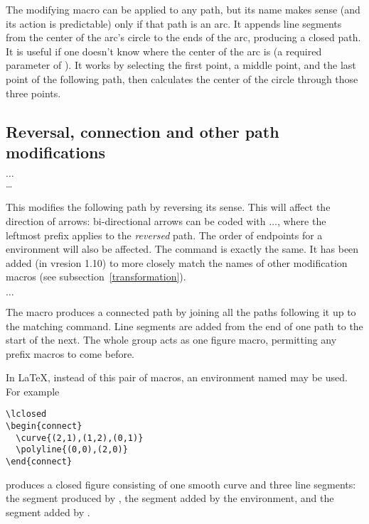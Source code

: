 \documentclass[letterpaper]{article}
\begin{document}
The modifying macro  can be applied to any path, but its
name makes sense (and its action is predictable) only if that path is an
arc. It appends line segments from the center of the arc's circle to the
ends of the arc, producing a closed path. It is useful if one doesn't
know where the center of the arc is (a required parameter of
). It works by selecting the first point, a middle point, and
the last point of the following path, then calculates the center of the
circle through those three points.


\subsection{Reversal, connection and other path modifications}%
\label{reversal}

\begin{cd}
$\ldots$\\
\ldots%
\end{cd}

This modifies the following path by reversing its sense. This will
affect the direction of arrows: bi-directional arrows can be coded with
$\ldots$, where the leftmost 
prefix applies to the \emph{reversed} path. The order of endpoints for
a  environment will also be affected. The command
 is exactly the same. It has been added (in vresion 1.10) to
more closely match the names of other modification macros (see
subsection~\ref{transformation}).

\begin{cd}
 $\ldots$ %
%
\end{cd}

The macro  produces a connected path by joining all the
paths following it up to the matching  command. Line
segments are added from the end of one path to the start of the next.
The whole group acts as one figure macro, permitting any prefix macros
to come before.

In \LaTeX{}, instead of this pair of macros, an environment named
 may be used. For example
\begin{verbatim}
\lclosed
\begin{connect}
  \curve{(2,1),(1,2),(0,1)}
  \polyline{(0,0),(2,0)}
\end{connect}
\end{verbatim}
produces a closed figure consisting of one smooth curve and three line
segments: the segment produced by , the segment added by
the  environment, and the segment added by .
\end{document}
